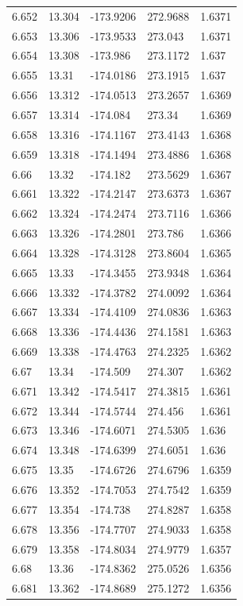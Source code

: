 \begin{tabular}{lllll}
6.652 & 13.304 & -173.9206 & 272.9688 & 1.6371 \\
6.653 & 13.306 & -173.9533 & 273.043 & 1.6371 \\
6.654 & 13.308 & -173.986 & 273.1172 & 1.637 \\
6.655 & 13.31 & -174.0186 & 273.1915 & 1.637 \\
6.656 & 13.312 & -174.0513 & 273.2657 & 1.6369 \\
6.657 & 13.314 & -174.084 & 273.34 & 1.6369 \\
6.658 & 13.316 & -174.1167 & 273.4143 & 1.6368 \\
6.659 & 13.318 & -174.1494 & 273.4886 & 1.6368 \\
6.66 & 13.32 & -174.182 & 273.5629 & 1.6367 \\
6.661 & 13.322 & -174.2147 & 273.6373 & 1.6367 \\
6.662 & 13.324 & -174.2474 & 273.7116 & 1.6366 \\
6.663 & 13.326 & -174.2801 & 273.786 & 1.6366 \\
6.664 & 13.328 & -174.3128 & 273.8604 & 1.6365 \\
6.665 & 13.33 & -174.3455 & 273.9348 & 1.6364 \\
6.666 & 13.332 & -174.3782 & 274.0092 & 1.6364 \\
6.667 & 13.334 & -174.4109 & 274.0836 & 1.6363 \\
6.668 & 13.336 & -174.4436 & 274.1581 & 1.6363 \\
6.669 & 13.338 & -174.4763 & 274.2325 & 1.6362 \\
6.67 & 13.34 & -174.509 & 274.307 & 1.6362 \\
6.671 & 13.342 & -174.5417 & 274.3815 & 1.6361 \\
6.672 & 13.344 & -174.5744 & 274.456 & 1.6361 \\
6.673 & 13.346 & -174.6071 & 274.5305 & 1.636 \\
6.674 & 13.348 & -174.6399 & 274.6051 & 1.636 \\
6.675 & 13.35 & -174.6726 & 274.6796 & 1.6359 \\
6.676 & 13.352 & -174.7053 & 274.7542 & 1.6359 \\
6.677 & 13.354 & -174.738 & 274.8287 & 1.6358 \\
6.678 & 13.356 & -174.7707 & 274.9033 & 1.6358 \\
6.679 & 13.358 & -174.8034 & 274.9779 & 1.6357 \\
6.68 & 13.36 & -174.8362 & 275.0526 & 1.6356 \\
6.681 & 13.362 & -174.8689 & 275.1272 & 1.6356 \\

\end{tabular}
